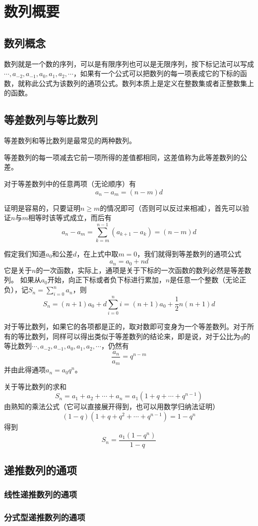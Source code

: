 
\section{数列概要}
\label{sec:number-sequence-general}

\subsection{数列概念}

数列就是一个数的序列，可以是有限序列也可以是无限序列，按下标记法可以写成$\cdots,a_{-2},a_{-1},a_0,a_1,a_2,\cdots$，如果有一个公式可以把数列的每一项表成它的下标的函数，就称此公式为该数列的通项公式。数列本质上是定义在整数集或者正整数集上的函数。

\subsection{等差数列与等比数列}

等差数列和等比数列是最常见的两种数列。

等差数列的每一项减去它前一项所得的差值都相同，这差值称为此等差数列的公差。

对于等差数列中的任意两项（无论顺序）有
$$
a_n-a_m=(n-m)d
$$

证明是容易的，只要证明$n\geqslant m$的情况即可（否则可以反过来相减），首先可以验证$n$与$m$相等时该等式成立，而后有
$$
a_n-a_m=\sum_{k=m}^{n-1}(a_{k+1}-a_k)=(n-m)d
$$

假定我们知道$a_0$和公差$d$，在上式中取$m=0$，我们就得到等差数列的通项公式
$$
a_n=a_0+nd
$$
它是关于$n$的一次函数，实际上，通项是关于下标的一次函数的数列必然是等差数列。
如果从$a_0$开始，向正下标或者负下标进行累加，$n$是任意一个整数（无论正负），记$S_n=\sum_{i=0}^{n}a_n$，则
$$
S_n=(n+1)a_0+d\sum_{i=0}^ni=(n+1)a_0+\frac{1}{2}n(n+1)d
$$

对于等比数列，如果它的各项都是正的，取对数即可变身为一个等差数列。对于所有的等比数列，同样可以得出类似于等差数列的结论来，即是说，对于公比为$q$的等比数列$\cdots,a_{-2},a_{-1},a_0,a_1,a_2,\cdots$，仍然有
$$
\frac{a_n}{a_m}=q^{n-m}
$$
并由此得通项$a_n=a_0q^n$。

关于等比数列的求和
\[ S_n = a_1+a_2+\cdots+a_n = a_1(1+q+\cdots+q^{n-1}) \]
由熟知的乘法公式（它可以直接展开得到，也可以用数学归纳法证明）
\[ (1-q)(1+q+q^2+\cdots+q^{n-1})=1-q^n \]
得到
\[ S_n = \frac{a_1(1-q^n)}{1-q} \]

\subsection{递推数列的通项}

\subsubsection{线性递推数列的通项}

\subsubsection{分式型递推数列的通项}

